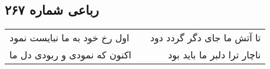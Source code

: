 \begin{center}
\section*{رباعی شماره ۲۶۷}
\label{sec:sh267}
\begin{longtable}{l p{0.5cm} r}
اول رخ خود به ما نبایست نمود
&&
تا آتش ما جای دگر گردد دود
\\
اکنون که نمودی و ربودی دل ما
&&
ناچار ترا دلبر ما باید بود
\\
\end{longtable}
\end{center}
